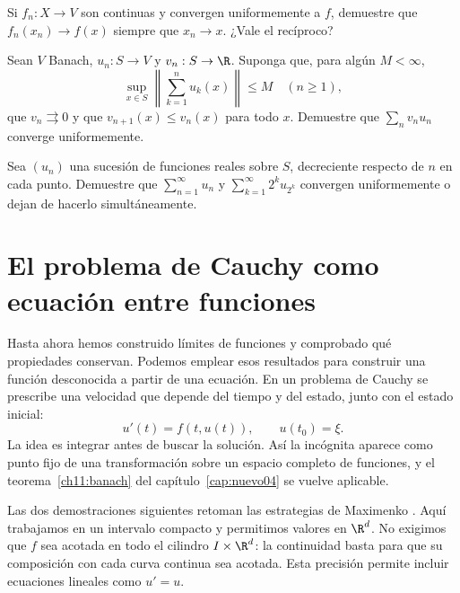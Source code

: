 \begin{ejercicio}\label{ej:lectura-26-6}
Si $f_n:X\to V$ son continuas y convergen uniformemente a $f$, demuestre que $f_n(x_n)\to f(x)$ siempre que $x_n\to x$. ¿Vale el recíproco?
\end{ejercicio}


\begin{ejercicio}\label{ej:lectura-26-7}
Sean $V$ Banach, $u_n:S\to V$ y $v_n:S\to\R$. Suponga que, para algún $M<\infty$,
\[
 \sup_{x\in S}\left\|\sum_{k=1}^nu_k(x)\right\|\le M\quad(n\ge1),
\]
que $v_n\rightrightarrows0$ y que $v_{n+1}(x)\le v_n(x)$ para todo $x$. Demuestre que $\sum_nv_nu_n$ converge uniformemente.
\end{ejercicio}


\begin{ejercicio}\label{ej:lectura-26-8}
Sea $(u_n)$ una sucesión de funciones reales sobre $S$, decreciente respecto de $n$ en cada punto. Demuestre que $\sum_{n=1}^\infty u_n$ y $\sum_{k=1}^\infty 2^ku_{2^k}$ convergen uniformemente o dejan de hacerlo simultáneamente.
\end{ejercicio}


\section{El problema de Cauchy como ecuación entre funciones}\label{ampl:picard}
Hasta ahora hemos construido límites de funciones y comprobado qué propiedades conservan. Podemos emplear esos resultados para construir una función desconocida a partir de una ecuación. En un problema de Cauchy se prescribe una velocidad que depende del tiempo y del estado, junto con el estado inicial:
\[
 u'(t)=f(t,u(t)),\qquad u(t_0)=\xi.
\]
La idea es integrar antes de buscar la solución. Así la incógnita aparece como punto fijo de una transformación sobre un espacio completo de funciones, y el teorema~\ref{ch11:banach} del capítulo~\ref{cap:nuevo04} se vuelve aplicable.

Las dos demostraciones siguientes retoman las estrategias de Maximenko \cite{max-picard}. Aquí trabajamos en un intervalo compacto y permitimos valores en $\R^d$. No exigimos que $f$ sea acotada en todo el cilindro $I\times\R^d$: la continuidad basta para que su composición con cada curva continua sea acotada. Esta precisión permite incluir ecuaciones lineales como $u'=u$.

